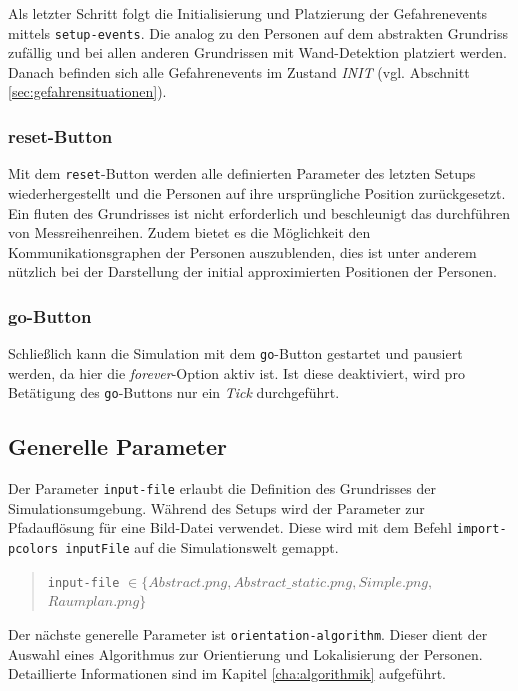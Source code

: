 Als letzter Schritt folgt die Initialisierung und Platzierung der Gefahrenevents  mittels \verb|setup-events|. Die analog zu den Personen auf dem abstrakten Grundriss zufällig und bei allen anderen Grundrissen mit Wand-Detektion platziert werden. Danach befinden sich alle Gefahrenevents im Zustand \emph{INIT} (vgl. Abschnitt \ref{sec:gefahrensituationen}).
 
\subsubsection*{reset-Button}

Mit dem \verb|reset|-Button werden alle definierten Parameter des letzten Setups wiederhergestellt und die Personen auf ihre ursprüngliche Position zurückgesetzt.
Ein fluten des Grundrisses ist nicht erforderlich und beschleunigt das durchführen von Messreihenreihen.
Zudem bietet es die Möglichkeit den Kommunikationsgraphen der Personen auszublenden, dies ist unter anderem nützlich bei der Darstellung der initial approximierten Positionen der Personen.

\subsubsection*{go-Button}

Schließlich kann die Simulation mit dem \verb|go|-Button gestartet und pausiert werden, da hier die \emph{forever}-Option aktiv ist. Ist diese deaktiviert, wird pro Betätigung des \verb|go|-Buttons nur ein \emph{Tick} durchgeführt.

\subsection{Generelle Parameter}
\label{sec:gui_general}

Der Parameter \verb|input-file| erlaubt die Definition des Grundrisses der Simulationsumgebung. Während des Setups wird der Parameter zur Pfadauflösung für eine Bild-Datei verwendet. Diese wird mit dem Befehl \verb|import-pcolors inputFile| auf die Simulationswelt gemappt.

\begin{quote}
\verb|input-file| $\in \{Abstract.png, Abstract\_static.png, Simple.png,$ \\\hspace*{2.6cm}$Raumplan.png\}$
\end{quote}

Der nächste generelle Parameter ist \verb|orientation-algorithm|. Dieser dient der Auswahl eines Algorithmus zur Orientierung und Lokalisierung der Personen. Detaillierte Informationen sind im Kapitel \ref{cha:algorithmik} aufgeführt.

